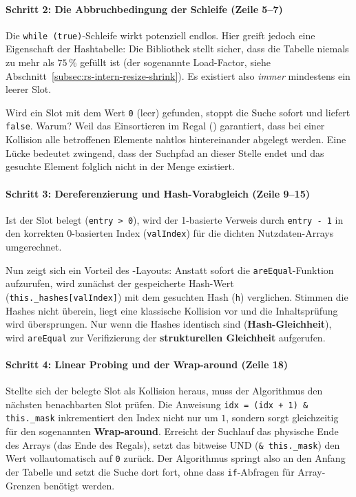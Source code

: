 \paragraph*{Schritt 2: Die Abbruchbedingung der Schleife (Zeile 5–7)}
Die \texttt{while (true)}-Schleife wirkt potenziell endlos. Hier greift jedoch eine Eigenschaft der Hashtabelle: Die Bibliothek stellt sicher, dass die Tabelle niemals zu mehr als $75\,\%$ gefüllt ist (der sogenannte Load-Factor, siehe Abschnitt~\ref{subsec:rs-intern-resize-shrink}). Es existiert also \emph{immer} mindestens ein leerer Slot. 

Wird ein Slot mit dem Wert \texttt{0} (leer) gefunden, stoppt die Suche sofort und liefert \texttt{false}. Warum? Weil das Einsortieren im Regal (\textit{}) garantiert, dass bei einer Kollision alle betroffenen Elemente nahtlos hintereinander abgelegt werden. Eine Lücke bedeutet zwingend, dass der Suchpfad an dieser Stelle endet und das gesuchte Element folglich nicht in der Menge existiert.

\paragraph*{Schritt 3: Dereferenzierung und Hash-Vorabgleich (Zeile 9–15)}
Ist der Slot belegt (\texttt{entry > 0}), wird der 1-basierte Verweis durch \texttt{entry - 1} in den korrekten 0-basierten Index (\texttt{valIndex}) für die dichten Nutzdaten-Arrays umgerechnet. 

Nun zeigt sich ein Vorteil des -Layouts: Anstatt sofort die \texttt{areEqual}-Funktion aufzurufen, wird zunächst der gespeicherte Hash-Wert (\texttt{this._hashes[valIndex]}) mit dem gesuchten Hash (\texttt{h}) verglichen. Stimmen die Hashes nicht überein, liegt eine klassische Kollision vor und die Inhaltsprüfung wird übersprungen. Nur wenn die Hashes identisch sind (\textbf{Hash-Gleichheit}), wird \texttt{areEqual} zur Verifizierung der \textbf{strukturellen Gleichheit} aufgerufen.

\paragraph*{Schritt 4: Linear Probing und der Wrap-around (Zeile 18)}
Stellte sich der belegte Slot als Kollision heraus, muss der Algorithmus den nächsten benachbarten Slot prüfen. Die Anweisung \texttt{idx = (idx + 1) & this._mask} inkrementiert den Index nicht nur um $1$, sondern sorgt gleichzeitig für den sogenannten \textbf{Wrap-around}. Erreicht der Suchlauf das physische Ende des Arrays (das Ende des Regals), setzt das bitweise UND (\texttt{& this._mask}) den Wert vollautomatisch auf \texttt{0} zurück. Der Algorithmus springt also an den Anfang der Tabelle und setzt die Suche dort fort, ohne dass \texttt{if}-Abfragen für Array-Grenzen benötigt werden.

